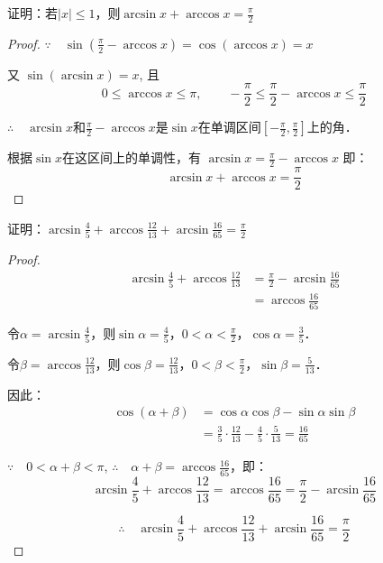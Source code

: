 \begin{example}
证明：若$|x|\le 1$，则$\arcsin x+\arccos x=\frac{\pi}{2}$

\end{example}

\begin{proof}
 $\because\quad    \sin\left(\frac{\pi}{2}-\arccos x\right)=\cos(\arccos x)=x$

    又    $\sin(\arcsin x)=x$, 且
  \[  0\le \arccos x\le \pi,\qquad -\frac{\pi}{2}\le \frac{\pi}{2}-\arccos x\le \frac{\pi}{2}\]

$\therefore\quad \arcsin x$和$\frac{\pi}{2}-\arccos x$是$\sin x$在单调区间$\left[-\frac{\pi}{2},\frac{\pi}{2}\right]$上的角．

根据$\sin x$在这区间上的单调性，有
$\arcsin x=\frac{\pi}{2}-\arccos x$
即：
\[\arcsin x+\arccos x=\frac{\pi}{2}\]
\end{proof}

\begin{example}
证明：$\arcsin\frac{4}{5}+\arccos\frac{12}{13}+\arcsin\frac{16}{65}=\frac{\pi}{2}$
\end{example}

\begin{proof}
\[\begin{split}
    \arcsin\frac{4}{5}+\arccos\frac{12}{13}&=\frac{\pi}{2}-\arcsin\frac{16}{65}\\
&=\arccos\frac{16}{65}
\end{split}\]
    
令$\alpha=\arcsin\frac{4}{5}$，则$\sin\alpha=\frac{4}{5}$，$0<\alpha<\frac{\pi}{2}$，$\cos\alpha=\frac{3}{5}$．

令$\beta=\arccos\frac{12}{13}$，则$\cos\beta=\frac{12}{13}$，$0<\beta<\frac{\pi}{2}$，$\sin\beta=\frac{5}{13}$．

因此：\[\begin{split}
    \cos(\alpha+\beta)&=\cos\alpha\cos\beta-\sin\alpha\sin\beta\\
    &=\frac{3}{5}\cdot \frac{12}{13}-\frac{4}{5}\cdot \frac{5}{13}=\frac{16}{65}
\end{split}\]

$\because\quad 0<\alpha+\beta<\pi$, $\therefore\quad \alpha+\beta=\arccos\frac{16}{65}$，即：
\[\arcsin\frac{4}{5}+\arccos\frac{12}{13}=\arccos\frac{16}{65}=\frac{\pi}{2}-\arcsin\frac{16}{65}\]

\[\therefore\quad \arcsin\frac{4}{5}+\arccos\frac{12}{13}+\arcsin\frac{16}{65}=\frac{\pi}{2}\]
\end{proof}


